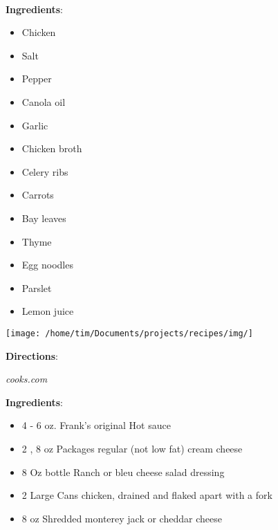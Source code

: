 \documentclass[11pt, twoside, openany]{book}
\begin{document}
 \label{chicken-noodle-soup}\hfill\textit{}\\
\begin{minipage}[t]{0.8\linewidth}
\textbf{Ingredients}:\vspace{-3mm}
\begin{multicols}{2}
\begin{itemize}\setlength\itemsep{-1mm}
\item Chicken
\item Salt
\item Pepper
\item Canola oil
\item Garlic
\item Chicken broth
\item Celery ribs
\item Carrots
\item Bay leaves
\item Thyme
\item Egg noodles
\item Parslet
\item Lemon juice
\end{itemize}
\end{multicols}
\end{minipage}
\begin{minipage}[t]{0.2\linewidth}
\centering \strut\vspace*{-\baselineskip}\newline
\texttt{[image: /home/tim/Documents/projects/recipes/img/]}\\
\end{minipage}\vspace{3mm}
\textbf{Directions}:
\vspace{-3mm}\begin{enumerate}\setlength\itemsep{-1mm}
\end{enumerate}
 \label{chicken-wing-dip}\hfill\textit{cooks.com}\\
\begin{minipage}[t]{0.8\linewidth}
\textbf{Ingredients}:\vspace{-3mm}
\begin{multicols}{2}
\begin{itemize}\setlength\itemsep{-1mm}
\item 4 - 6 oz. Frank's original Hot sauce
\item 2 , 8 oz Packages regular (not low fat) cream cheese
\item 8 Oz bottle Ranch or bleu cheese salad dressing
\item 2 Large Cans chicken, drained and flaked apart with a fork
\item 8 oz Shredded monterey jack or cheddar cheese
\end{itemize}
\end{multicols}
\end{minipage}
\end{document}
